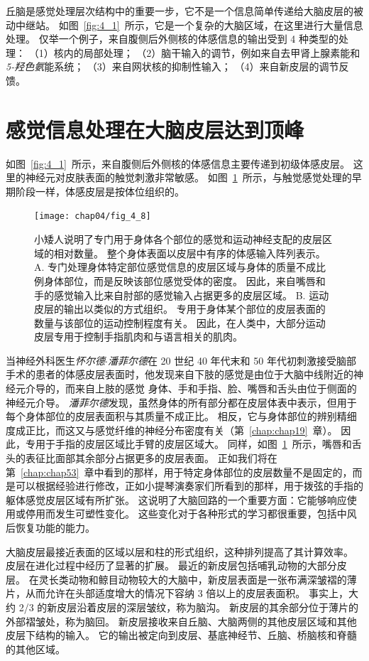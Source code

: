 丘脑是感觉处理层次结构中的重要一步，它不是一个信息简单传递给大脑皮层的被动中继站。 
如图~\ref{fig:4_1}~所示，它是一个复杂的大脑区域，在这里进行大量信息处理。 
仅举一个例子，来自腹侧后外侧核的体感信息的输出受到 4 种类型的处理：
（1）核内的局部处理；
（2）脑干输入的调节，例如来自去甲肾上腺素能和\textit{5-羟色氨}能系统； 
（3）来自网状核的抑制性输入； 
（4）来自新皮层的调节反馈。


\section{感觉信息处理在大脑皮层达到顶峰}

如图~\ref{fig:4_1}~所示，来自腹侧后外侧核的体感信息主要传递到初级体感皮层。 
这里的神经元对皮肤表面的触觉刺激非常敏感。 
如图~\ref{fig:4_8}~所示，与触觉感觉处理的早期阶段一样，体感皮层是按体位组织的。


\begin{figure}[htbp]
	\centering
	\texttt{[image: chap04/fig\_4\_8]}
	\caption{小矮人说明了专门用于身体各个部位的感觉和运动神经支配的皮层区域的相对数量。
		整个身体表面以皮层中有序的体感输入阵列表示。
		A. 专门处理身体特定部位感觉信息的皮层区域与身体的质量不成比例身体部位，而是反映该部位感觉受体的密度。
		因此，来自嘴唇和手的感觉输入比来自肘部的感觉输入占据更多的皮层区域。
		B. 运动皮层的输出以类似的方式组织。
		专用于身体某个部位的皮层表面的数量与该部位的运动控制程度有关。
		因此，在人类中，大部分运动皮层专用于控制手指肌肉和与语言相关的肌肉。}
	\label{fig:4_8}
\end{figure}


当神经外科医生\textit{怀尔德$\cdot$潘菲尔德}在 20 世纪 40 年代末和 50 年代初刺激接受脑部手术的患者的体感皮层表面时，他发现来自下肢的感觉是由位于大脑中线附近的神经元介导的，而来自上肢的感觉 身体、手和手指、脸、嘴唇和舌头由位于侧面的神经元介导。 
\textit{潘菲尔德}发现，虽然身体的所有部分都在皮层体表中表示，但用于每个身体部位的皮层表面积与其质量不成正比。 
相反，它与身体部位的辨别精细度成正比，而这又与感觉纤维的神经分布密度有关（第~\ref{chap:chap19}~章）。 
因此，专用于手指的皮层区域比手臂的皮层区域大。 
同样，如图~\ref{fig:4_8}~所示，嘴唇和舌头的表征比面部其余部分占据更多的皮层表面。
正如我们将在第~\ref{chap:chap53}~章中看到的那样，用于特定身体部位的皮层数量不是固定的，而是可以根据经验进行修改，正如小提琴演奏家们所看到的那样，用于拨弦的手指的躯体感觉皮层区域有所扩张。
这说明了大脑回路的一个重要方面：它能够响应使用或停用而发生可塑性变化。
这些变化对于各种形式的学习都很重要，包括中风后恢复功能的能力。


大脑皮层最接近表面的区域以层和柱的形式组织，这种排列提高了其计算效率。 
皮层在进化过程中经历了显著的扩展。 
最近的新皮层包括哺乳动物的大部分皮层。 
在灵长类动物和鲸目动物较大的大脑中，新皮层表面是一张布满深皱褶的薄片，从而允许在头部适度增大的情况下容纳 3 倍以上的皮层表面积。
事实上，大约 2/3 的新皮层沿着皮层的深层皱纹，称为脑沟。
新皮层的其余部分位于薄片的外部褶皱处，称为脑回。 
新皮层接收来自丘脑、大脑两侧的其他皮层区域和其他皮层下结构的输入。 
它的输出被定向到皮层、基底神经节、丘脑、桥脑核和脊髓的其他区域。


